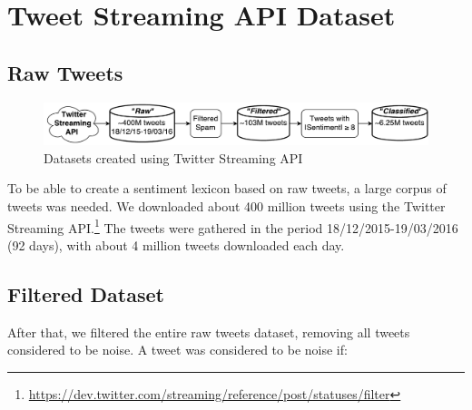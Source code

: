 \section{Tweet Streaming API Dataset}
\label{sec:twitter_streaming_dataset}
\subsection*{Raw Tweets}

\begin{figure}[t]
    \centering
    \includegraphics[width=\textwidth]{./figs/twitter_datasets}
    \caption{Datasets created using Twitter Streaming API}
    \label{fig:twitter_steaming_api_datasets}
\end{figure}


To be able to create a sentiment lexicon based on raw tweets, a large corpus of tweets was needed. We downloaded about 400 million tweets using the Twitter Streaming API.\footnote{\url{https://dev.twitter.com/streaming/reference/post/statuses/filter}} The tweets were gathered in the period 18/12/2015-19/03/2016 (92 days), with about 4 million tweets downloaded each day.

\subsection*{Filtered Dataset}
\label{sec:filtered}
After that, we filtered the entire raw tweets dataset, removing all tweets considered to be noise. A tweet was considered to be noise if:


